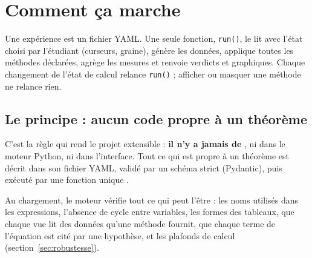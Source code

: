 \documentclass[11pt,a4paper]{article}
\begin{document}
\section{Comment ça marche}

\begin{enbref}
Une expérience est un fichier YAML. Une seule fonction, \texttt{run()}, le lit avec l'état choisi par l'étudiant (curseurs, graine), génère les données, applique toutes les méthodes déclarées, agrège les mesures et renvoie verdicts et graphiques. Chaque changement de l'état de calcul relance \texttt{run()} ; afficher ou masquer une méthode ne relance rien.
\end{enbref}

\subsection{Le principe : aucun code propre à un théorème}
C'est la règle qui rend le projet extensible : \textbf{il n'y a jamais de }, ni dans le moteur Python, ni dans l'interface. Tout ce qui est propre à un théorème est décrit dans son fichier YAML, validé par un schéma strict (Pydantic), puis exécuté par une fonction unique .

Au chargement, le moteur vérifie tout ce qui peut l'être : les noms utilisés dans les expressions, l'absence de cycle entre variables, les formes des tableaux, que chaque vue lit des données qu'une méthode fournit, que chaque terme de l'équation est cité par une hypothèse, et les plafonds de calcul (section~\ref{sec:robustesse}).
\end{document}
